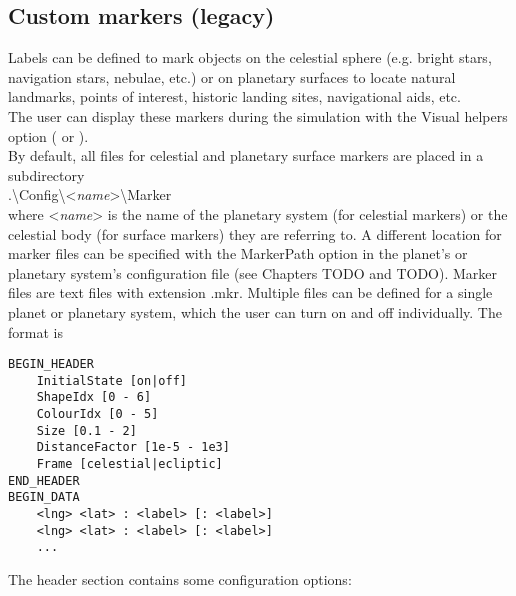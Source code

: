 \documentclass[Orbiter Developer Manual.tex]{subfiles}
\begin{document}
\subsection{Custom markers (legacy)}

\noindent
Labels can be defined to mark objects on the celestial sphere (e.g. bright stars, navigation stars, nebulae, etc.) or on planetary surfaces to locate natural landmarks, points of interest, historic landing sites, navigational aids, etc.\\
The user can display these markers during the simulation with the Visual helpers option ( or \Ctrl{}).\\
By default, all files for celestial and planetary surface markers are placed in a subdirectory\\
\indent .\textbackslash Config\textbackslash <\textit{name}>\textbackslash Marker\\
where <\textit{name}> is the name of the planetary system (for celestial markers) or the celestial body (for surface markers) they are referring to. A different location for marker files can be specified with the MarkerPath option in the planet’s or planetary system’s configuration file (see Chapters TODO and TODO). Marker files are text files with extension .mkr. Multiple files can be defined for a single planet or planetary system, which the user can turn on and off individually. The format is

\begin{lstlisting}[language=OSFS]
BEGIN_HEADER
	InitialState [on|off]
	ShapeIdx [0 - 6]
	ColourIdx [0 - 5]
	Size [0.1 - 2]
	DistanceFactor [1e-5 - 1e3]
	Frame [celestial|ecliptic]
END_HEADER
BEGIN_DATA
	<lng> <lat> : <label> [: <label>]
	<lng> <lat> : <label> [: <label>]
	...
\end{lstlisting}

\noindent
The header section contains some configuration options:
\end{document}
